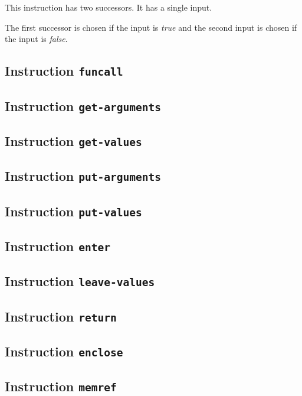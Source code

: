 This instruction has two successors.  It has a single input. 

The first successor is chosen if the input is \emph{true} and the
second input is chosen if the input is \emph{false}.%

\subsection{Instruction \texttt{funcall}}

\subsection{Instruction \texttt{get-arguments}}

\subsection{Instruction \texttt{get-values}}

\subsection{Instruction \texttt{put-arguments}}

\subsection{Instruction \texttt{put-values}}

\subsection{Instruction \texttt{enter}}

\subsection{Instruction \texttt{leave-values}}

\subsection{Instruction \texttt{return}}

\subsection{Instruction \texttt{enclose}}

\subsection{Instruction \texttt{memref}}

